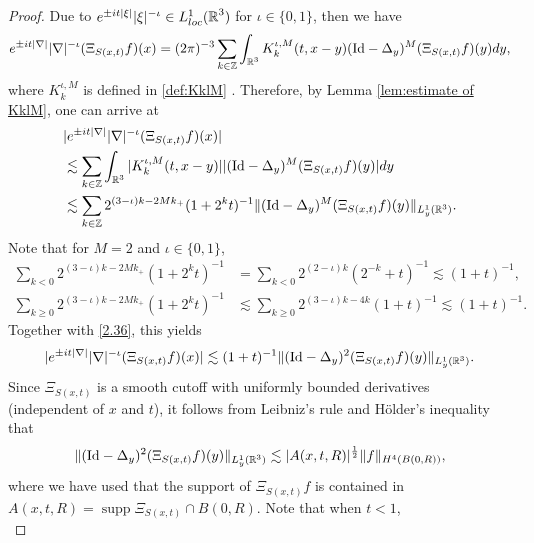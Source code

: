 \documentclass[11pt,twoside]{article}
\def\Z{\mathop{\mathbb Z\kern 0pt}\nolimits}
\def\R{\mathop{\mathbb R\kern 0pt}\nolimits}
\def\f{\frac}
\def\ls{\lesssim}
\newcommand{\Id}{\mathrm{Id}}
\DeclareMathOperator{\supp}{supp}
\theoremstyle{plain}
\theoremstyle{definition}
\numberwithin{equation}{section}
\begin{document}
	\begin{proof}
		Due to $e^{\pm it|\xi|}|\xi|^{-\iota}\in L^1_{loc}(\R^3)$ for $\iota\in\{0,1\}$, then we have
		\begin{equation*}
			e^{\pm it|\nabla|}|\nabla|^{-\iota}(\Xi_{S(x,t)}f)(x)
			=
			(2\pi)^{-3}\sum_{k\in \Z}\int_{\R^3}K_k^{\iota,M}(t,x-y)(\Id-\Delta_y)^M(\Xi_{S(x,t)}f)(y)dy,
		\end{equation*}		
		where $K^{\iota,M}_k$ is defined in \eqref{def:KklM} .
		Therefore, by Lemma \ref{lem:estimate of KklM}, one can arrive at
		\begin{equation}\label{2.36}
			\begin{split}
				&|e^{\pm it|\nabla|}|\nabla|^{-\iota}(\Xi_{S(x,t)}f)(x)|\\
				&\ls
				\sum_{k\in \Z}\int_{\R^3}|K_k^{\iota,M}(t,x-y)||(\Id-\Delta_y)^M(\Xi_{S(x,t)}f)(y)|dy\\
				&\ls
				\sum_{k\in \Z}2^{(3-\iota)k-2Mk_+}(1+2^kt)^{-1}\|(\Id-\Delta_y)^M(\Xi_{S(x,t)}f)(y)\|_{L^1_y(\R^3)}.
			\end{split}
		\end{equation}
		Note that for $M=2$ and $\iota \in\{0,1\}$,
		\begin{equation*}
			\begin{split}
				\sum_{k<0}2^{(3-\iota)k-2Mk_+}(1+2^kt)^{-1}
				&=\sum_{k<0}2^{(2-\iota)k}(2^{-k}+t)^{-1}
				\ls(1+t)^{-1},\\
				\sum_{k\ge0}2^{(3-\iota)k-2Mk_+}(1+2^kt)^{-1}
				&\ls\sum_{k\ge0}2^{(3-\iota)k-4k}(1+t)^{-1}
				\ls(1+t)^{-1}.
			\end{split}
		\end{equation*}
		Together with \eqref{2.36}, this yields
		\begin{equation}\label{2.37}
			|e^{\pm it|\nabla|}|\nabla|^{-\iota}(\Xi_{S(x,t)}f)(x)|
			\ls (1+t)^{-1}\|(\Id-\Delta_y)^2(\Xi_{S(x,t)}f)(y)\|_{L^1_y(\R^3)}.
		\end{equation}
		Since $\Xi_{S(x,t)}$ is a smooth cutoff with uniformly bounded derivatives (independent of $x$ and $t$),
		it follows from Leibniz's rule and H\"older's inequality that
		\begin{equation}\label{2.38}
			\|(\Id-\Delta_y)^2(\Xi_{S(x,t)}f)(y)\|_{L^1_y(\R^3)} \ls |A(x,t,R)|^{\f12} \|f\|_{H^4(B(0,R))},
		\end{equation}
 		where we have used that the support of $\Xi_{S(x,t)}f$ is contained in $A(x,t,R)=\supp \Xi_{S(x,t)}\cap B(0,R)$.
 		Note that when $t<1$,
 		\begin{equation}\label{CYC-2}

\end{equation}
\end{proof}
\end{document}
